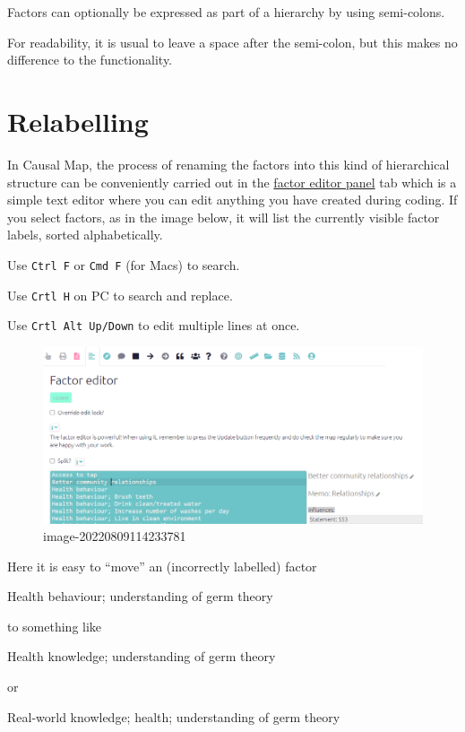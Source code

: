 \documentclass[
]{book}
\begin{document}
Factors can optionally be expressed as part of a hierarchy by using semi-colons.

For readability, it is usual to leave a space after the semi-colon, but this makes no difference to the functionality.

\hypertarget{relabelling}{%
\section{Relabelling}\label{relabelling}}

In Causal Map, the process of renaming the factors into this kind of hierarchical structure can be conveniently carried out in the \protect\hyperlink{xfactor-editor}{factor editor panel} tab which is a simple text editor where you can edit anything you have created during coding. If you select factors, as in the image below, it will list the currently visible factor labels, sorted alphabetically.

Use \texttt{Ctrl\ F} or \texttt{Cmd\ F} (for Macs) to search.

Use \texttt{Crtl\ H} on PC to search and replace.

Use \texttt{Crtl\ Alt\ Up/Down} to edit multiple lines at once.

\begin{figure}
\centering
\includegraphics[width=6.77083in,height=\textheight]{_assets/image-20220809114233781.png}
\caption{image-20220809114233781}
\end{figure}

Here it is easy to ``move'' an (incorrectly labelled) factor

Health behaviour; understanding of germ theory

to something like

Health knowledge; understanding of germ theory

or

Real-world knowledge; health; understanding of germ theory
\end{document}
